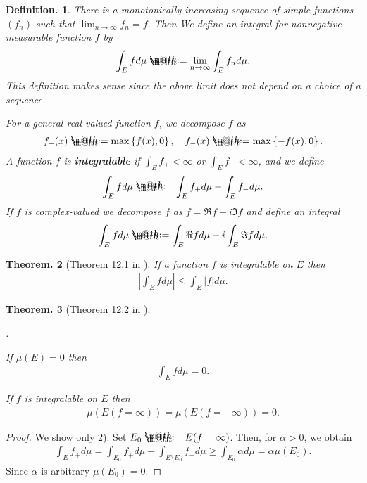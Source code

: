 \documentclass[openany, a4paper, oneside]{book}
\makeatletter
\newcounter{enum2}
\renewenvironment{enumerate}{%
\begin{list}%
{%
\arabic{enum2}.\ \,%
}%
{%
\usecounter{enum2}
\setlength{\itemindent}{0pt}%
\setlength{\leftmargin}{6pt}%
\setlength{\rightmargin}{0pt}%
\setlength{\labelsep}{0pt}%
\setlength{\labelwidth}{6pt}%
\setlength{\itemsep}{0pt}%
\setlength{\parsep}{0pt}%
\setlength{\listparindent}{0pt}%
}
}{%
\end{list}%
}
\newcommand*{\defeq}{\mathrel{\rlap{%
\raisebox{0.3ex}{$\m@th\cdot$}}%
\raisebox{-0.3ex}{$\m@th\cdot$}}%
=}
\theoremstyle{break}
\newtheorem{thm}{Theorem.}[section]
\theoremstyle{breakdefn}
\newtheorem{defn}[thm]{Definition.}
\newcommand{\abs}[1]{\left|#1\right|}
\newcommand{\cbk}[1]{\left\{#1\right\}}
\newcommand{\upbf}[1]{\textup{\textbf{#1}}}
\makeatother
\begin{document}
\begin{defn}
 There is a monotonically increasing sequence of simple functions $(f_n)$ such that $\lim_{n \to \infty} f_n = f$.
 Then  We define an integral for nonnegative measurable function $f$ by
 \begin{align}
  \int_E f d \mu
  \defeq
  \lim_{n \to \infty} \int_E f_n d \mu.
 \end{align}
 This definition makes sense since the above limit does not depend on a choice of a sequence.

 For a general real-valued function $f$, we decompose $f$ as
 \begin{align}
  f_+ (x)
  \defeq
  \max \cbk{f (x), 0}, \quad
  f_- (x)
  \defeq
  \max \cbk{- f (x), 0}.
 \end{align}
 A function $f$ is \upbf{integralable} if $\int_E f_+ < \infty$ or $\int_E f_- < \infty$, and we define
 \begin{align}
  \int_E f d \mu
  \defeq
  \int_E f_+ d \mu - \int_E f_- d \mu.
 \end{align}
 If $f$ is complex-valued we decompose $f$ as $f = \Re f + i \Im f$ and define an integral
 \begin{align}
  \int_E f d\mu
  \defeq
  \int_E \Re f d \mu + i \int_E \Im f d \mu.
 \end{align}
\end{defn}
\begin{thm}[Theorem 12.1 in \cite{SeizoIto1}]
 If a function $f$ is integralable on $E$ then
 \begin{align}
  \abs{\int_E f d\mu}
  \leq
  \int_E \abs{f} d\mu.
 \end{align}
\end{thm}
\begin{thm}[Theorem 12.2 in \cite{SeizoIto1}]
\begin{enumerate}
\item If $\mu (E) = 0$ then
    \begin{align}
     \int_E f d \mu = 0.
    \end{align}
\item If $f$ is integralable on $E$ then
    \begin{align}
     \mu (E (f = \infty)) = \mu (E (f = - \infty)) = 0.
    \end{align}
\end{enumerate}
\end{thm}
\begin{proof}
We show only 2).
Set $E_0 \defeq E (f = \infty)$.
Then, for $\alpha > 0$, we obtain
\begin{align}
 \int_E f_+ d \mu
 =
 \int_{E_0} f_+ d \mu + \int_{E \setminus E_0} f_+ d \mu
 \geq
 \int_{E_0} \alpha d \mu
 =
 \alpha \mu (E_0).
\end{align}
Since $\alpha$ is arbitrary $\mu (E_0) = 0$.
\end{proof}
\end{document}

